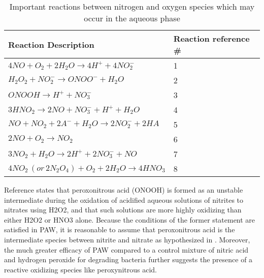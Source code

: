 \begin{table}[htpb]
  \begin{center}
    \begin{tabular}{|l |l |}
      \hline
      \textbf{Reaction Description} & \textbf{Reaction reference \#} \\\hline
      $4NO + O_2 + 2H_2O \rightarrow 4H^+ + 4NO_2^-$ & 1 \\\hline
      $H_2O_2 + NO_2^- \rightarrow ONOO^- + H_2O$ & 2 \\\hline
      $ONOOH \rightarrow H^+ + NO_3^-$ & 3 \\\hline
      $3HNO_2 \rightarrow 2NO + NO_3^- + H^+ + H_2O$ & 4 \\\hline
      $NO + NO_2 + 2A^- + H_2O \rightarrow 2NO_2^- + 2HA$ & 5 \\\hline
      $2NO + O_2 \rightarrow NO_2$ & 6 \\\hline
      $3NO_2 + H_2O \rightarrow 2H^+ + 2NO_3^- + NO$ & 7 \\\hline
      $4NO_2\,(or\,2N_2O_4) + O_2 + 2H_2O \rightarrow 4HNO_3$ & 8 \\\hline
    \end{tabular}
  \end{center}
  \caption{Important reactions between nitrogen and oxygen species which may occur in the aqueous phase}
  \label{tab:reactions}
\end{table}

Reference \cite{greenwood1984chemistry} states that peroxonitrous acid (ONOOH) is formed as an unstable intermediate during the oxidation of acidified aqueous solutions of nitrites to nitrates using H2O2, and that such solutions are more highly oxidizing than either H2O2 or HNO3 alone.  Because the conditions of the former statement are satisfied in PAW, it is reasonable to assume that peroxonitrous acid is the intermediate species between nitrite and nitrate as hypothesized in \cite{traylor2011long}.  Moreover, the much greater efficacy of PAW compared to a control mixture of nitric acid and hydrogen peroxide for degrading bacteria \cite{burlica2010bacteria} further suggests the presence of a reactive oxidizing species like peroxynitrous acid.

